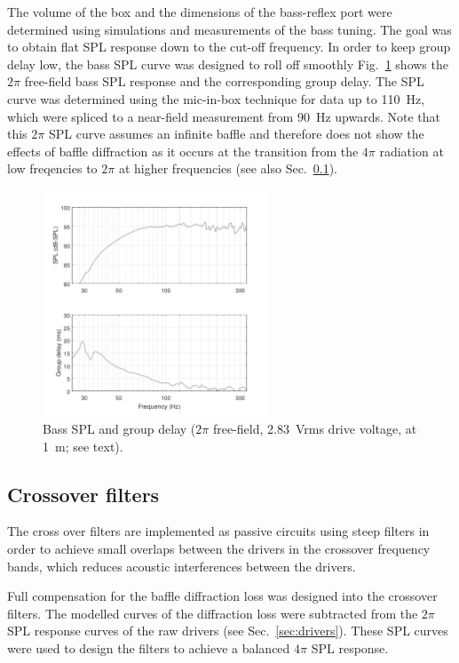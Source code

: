 \documentclass[12pt,a4paper]{article}
\providecommand{\figr}[1]{Fig.~\ref{fig:#1}}
\providecommand{\figlabel}[1]{\label{fig:#1}}
\providecommand{\sectn}[1]{Sec.~\ref{sec:#1}}
\providecommand{\seclabel}[1]{\label{sec:#1}}
\begin{document}
The volume of the box and the dimensions of the bass-reflex port were determined using simulations and measurements of the bass tuning. The goal was to obtain flat SPL response down to the cut-off frequency. In order to keep group delay low, the bass SPL curve was designed to roll off smoothly \figr{OSMC_bass_tuning} shows the $2\pi$ free-field bass SPL response and the corresponding group delay. The SPL curve was determined using the mic-in-box technique for data up to \SI{110}{Hz}, which were spliced to a near-field measurement from \SI{90}{Hz} upwards. Note that this $2\pi$ SPL curve assumes an infinite baffle and therefore does not show the effects of baffle diffraction as it occurs at the transition from the $4\pi$ radiation at low freqencies to $2\pi$ at higher frequencies (see also \sectn{crossover_filters}).

\begin{figure}[tb]
	\centering
	\includegraphics[width=0.6\textwidth]{OSMC_bass_tuning.pdf}
	\caption{Bass SPL and group delay ($2\pi$ free-field, \SI{2.83}{Vrms} drive voltage, at \SI{1}{m}; see text).}
	\figlabel{OSMC_bass_tuning}
\end{figure}


\subsection{Crossover filters}\seclabel{crossover_filters}

The cross over filters are implemented as passive circuits using steep filters in order to achieve small overlaps between the drivers in the crossover frequency bands, which reduces acoustic interferences between the drivers.

Full compensation for the baffle diffraction loss was designed into the crossover filters. The modelled curves of the diffraction loss were subtracted from the $2\pi$ SPL response curves of the raw drivers (see \sectn{drivers}). These SPL curves were used to design the filters to achieve a balanced $4\pi$ SPL response.\par
\end{document}
